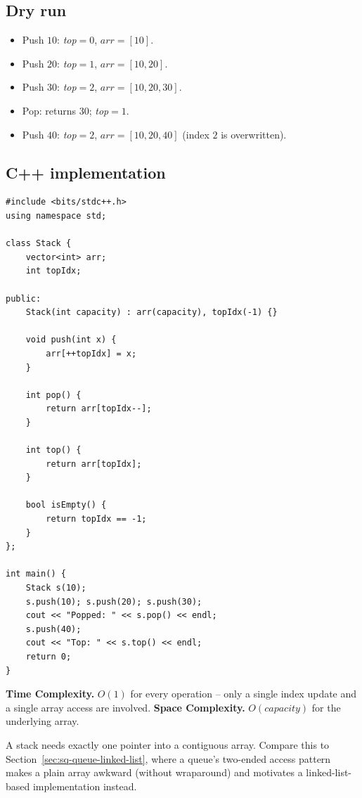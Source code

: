 \subsection*{Dry run}


\begin{itemize}
  \item Push $10$: \textit{top}$=0$, $\textit{arr}=[10]$.
  \item Push $20$: \textit{top}$=1$, $\textit{arr}=[10,20]$.
  \item Push $30$: \textit{top}$=2$, $\textit{arr}=[10,20,30]$.
  \item Pop: returns $30$; \textit{top}$=1$.
  \item Push $40$: \textit{top}$=2$, $\textit{arr}=[10,20,40]$ (index $2$
        is overwritten).
\end{itemize}

\subsection*{C++ implementation}

\begin{lstlisting}
#include <bits/stdc++.h>
using namespace std;

class Stack {
    vector<int> arr;
    int topIdx;

public:
    Stack(int capacity) : arr(capacity), topIdx(-1) {}

    void push(int x) {
        arr[++topIdx] = x;
    }

    int pop() {
        return arr[topIdx--];
    }

    int top() {
        return arr[topIdx];
    }

    bool isEmpty() {
        return topIdx == -1;
    }
};

int main() {
    Stack s(10);
    s.push(10); s.push(20); s.push(30);
    cout << "Popped: " << s.pop() << endl;
    s.push(40);
    cout << "Top: " << s.top() << endl;
    return 0;
}
\end{lstlisting}

\begin{complexitybox}
\textbf{Time Complexity.} $O(1)$ for every operation -- only a single
index update and a single array access are involved.
\textbf{Space Complexity.} $O(\textit{capacity})$ for the underlying
array.
\end{complexitybox}

\begin{takeawaybox}
A stack needs exactly one pointer into a contiguous array. Compare this to
Section~\ref{sec:sq-queue-linked-list}, where a queue's two-ended access
pattern makes a plain array awkward (without wraparound) and motivates a
linked-list-based implementation instead.
\end{takeawaybox}
